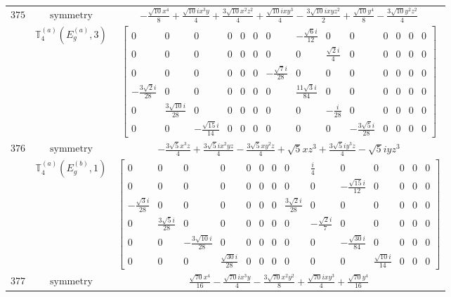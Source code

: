 \documentclass[fleqn,8pt,landscape]{jsarticle}
\begin{document}
\begin{longtable}{ccc}
$ 375 $ & $ \text{symmetry} $ & $ - \frac{\sqrt{10} x^{4}}{8} + \frac{\sqrt{10} i x^{3} y}{4} + \frac{3 \sqrt{10} x^{2} z^{2}}{4} + \frac{\sqrt{10} i x y^{3}}{4} - \frac{3 \sqrt{10} i x y z^{2}}{2} + \frac{\sqrt{10} y^{4}}{8} - \frac{3 \sqrt{10} y^{2} z^{2}}{4} $ \\
$  $ & $ \mathbb{T}_{4}^{(a)}(E_{g}^{(a)},3) $ & $ \begin{bmatrix} 0 & 0 & 0 & 0 & 0 & 0 & 0 & - \frac{\sqrt{6} i}{12} & 0 & 0 & 0 & 0 & 0 & 0 \\ 0 & 0 & 0 & 0 & 0 & 0 & 0 & 0 & \frac{\sqrt{2} i}{4} & 0 & 0 & 0 & 0 & 0 \\ 0 & 0 & 0 & 0 & 0 & 0 & - \frac{\sqrt{7} i}{28} & 0 & 0 & 0 & 0 & 0 & 0 & 0 \\ - \frac{3 \sqrt{2} i}{28} & 0 & 0 & 0 & 0 & 0 & 0 & \frac{11 \sqrt{3} i}{84} & 0 & 0 & 0 & 0 & 0 & 0 \\ 0 & \frac{3 \sqrt{10} i}{28} & 0 & 0 & 0 & 0 & 0 & 0 & - \frac{i}{28} & 0 & 0 & 0 & 0 & 0 \\ 0 & 0 & - \frac{\sqrt{15} i}{14} & 0 & 0 & 0 & 0 & 0 & 0 & - \frac{3 \sqrt{5} i}{28} & 0 & 0 & 0 & 0 \end{bmatrix} $ \\ \hline
$ 376 $ & $ \text{symmetry} $ & $ - \frac{3 \sqrt{5} x^{3} z}{4} + \frac{3 \sqrt{5} i x^{2} y z}{4} - \frac{3 \sqrt{5} x y^{2} z}{4} + \sqrt{5} x z^{3} + \frac{3 \sqrt{5} i y^{3} z}{4} - \sqrt{5} i y z^{3} $ \\
$  $ & $ \mathbb{T}_{4}^{(a)}(E_{g}^{(b)},1) $ & $ \begin{bmatrix} 0 & 0 & 0 & 0 & 0 & 0 & 0 & 0 & \frac{i}{4} & 0 & 0 & 0 & 0 & 0 \\ 0 & 0 & 0 & 0 & 0 & 0 & 0 & 0 & 0 & - \frac{\sqrt{15} i}{12} & 0 & 0 & 0 & 0 \\ - \frac{\sqrt{3} i}{28} & 0 & 0 & 0 & 0 & 0 & 0 & \frac{3 \sqrt{2} i}{28} & 0 & 0 & 0 & 0 & 0 & 0 \\ 0 & \frac{3 \sqrt{5} i}{28} & 0 & 0 & 0 & 0 & 0 & 0 & - \frac{\sqrt{2} i}{7} & 0 & 0 & 0 & 0 & 0 \\ 0 & 0 & - \frac{3 \sqrt{10} i}{28} & 0 & 0 & 0 & 0 & 0 & 0 & - \frac{\sqrt{30} i}{84} & 0 & 0 & 0 & 0 \\ 0 & 0 & 0 & \frac{\sqrt{30} i}{28} & 0 & 0 & 0 & 0 & 0 & 0 & \frac{\sqrt{10} i}{14} & 0 & 0 & 0 \end{bmatrix} $ \\ \hline
$ 377 $ & $ \text{symmetry} $ & $ \frac{\sqrt{70} x^{4}}{16} - \frac{\sqrt{70} i x^{3} y}{4} - \frac{3 \sqrt{70} x^{2} y^{2}}{8} + \frac{\sqrt{70} i x y^{3}}{4} + \frac{\sqrt{70} y^{4}}{16} $ \\

\end{longtable}
\end{document}
